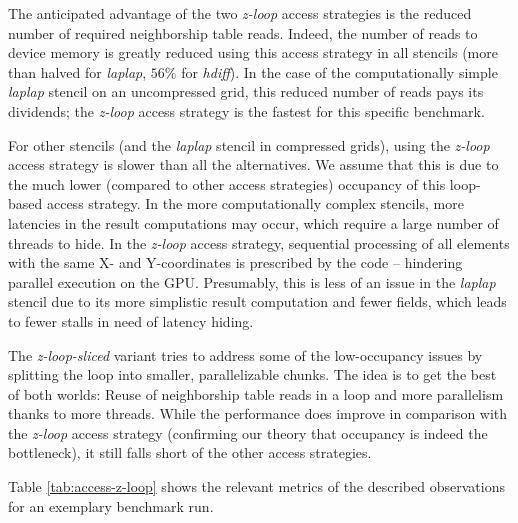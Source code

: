 The anticipated advantage of the two \emph{z-loop} access strategies is the reduced number of required neighborship table reads. Indeed, the number of reads to device memory is greatly reduced using this access strategy in all stencils (more than halved for \emph{laplap}, $56\%$ for \emph{hdiff}). In the case of the computationally simple \emph{laplap} stencil on an uncompressed grid, this reduced number of reads pays its dividends; the \emph{z-loop} access strategy is the fastest for this specific benchmark.

For other stencils (and the \emph{laplap} stencil in compressed grids), using the \emph{z-loop} access strategy is slower than all the alternatives.  We assume that this is due to the much lower (compared to other access strategies) occupancy of this loop-based access strategy. In the more computationally complex stencils, more latencies in the result computations may occur, which require a large number of threads to hide. In the \emph{z-loop} access strategy, sequential processing of all elements with the same X- and Y-coordinates is prescribed by the code -- hindering parallel execution on the GPU. Presumably, this is less of an issue in the \emph{laplap} stencil due to its more simplistic result computation and fewer fields, which leads to fewer stalls in need of latency hiding.

The \emph{z-loop-sliced} variant tries to address some of the low-occupancy issues by splitting the loop into smaller, parallelizable chunks. The idea is to get the best of both worlds: Reuse of neighborship table reads in a loop and more parallelism thanks to more threads. While the performance does improve in comparison with the \emph{z-loop} access strategy (confirming our theory that occupancy is indeed the bottleneck), it still falls short of the other access strategies.

Table \ref{tab:access-z-loop} shows the relevant metrics of the described observations for an exemplary benchmark run.



